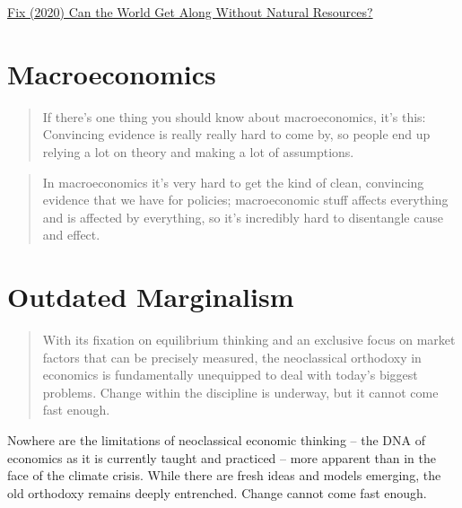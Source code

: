 \documentclass[
]{book}
\begin{document}
\href{https://economicsfromthetopdown.com/2020/06/18/can-the-world-get-along-without-natural-resources/}{Fix (2020) Can the World Get Along Without Natural Resources?}

\hypertarget{macroeconomics}{%
\section{Macroeconomics}\label{macroeconomics}}

\begin{quote}
If there's one thing you should know about macroeconomics, it's this:
Convincing evidence is really really hard to come by,
so people end up relying a lot on theory and
making a lot of assumptions.
\end{quote}

\begin{quote}
In macroeconomics it's very hard to get the kind of clean,
convincing evidence that we have for policies;
macroeconomic stuff affects everything and is affected by everything,
so it's incredibly hard to disentangle cause and effect.
\end{quote}

\hypertarget{outdated-marginalism}{%
\section{Outdated Marginalism}\label{outdated-marginalism}}

\begin{quote}
With its fixation on equilibrium thinking and an exclusive focus on market factors that can be precisely measured, the neoclassical orthodoxy in economics is fundamentally unequipped to deal with today's biggest problems. Change within the discipline is underway, but it cannot come fast enough.
\end{quote}

Nowhere are the limitations of neoclassical economic thinking -- the DNA of economics as it is currently taught and practiced -- more apparent than in the face of the climate crisis. While there are fresh ideas and models emerging, the old orthodoxy remains deeply entrenched. Change cannot come fast enough.
\end{document}
